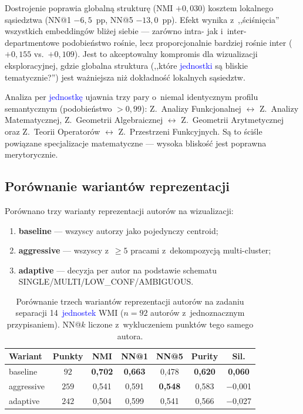 \documentclass[a4paper,11pt,twocolumn]{article}
\newcommand{\hl}[1]{\textcolor{blue}{#1}}
\begin{document}
Dostrojenie poprawia globalną strukturę (NMI $+0{,}030$) kosztem
lokalnego sąsiedztwa (NN@1 $-6{,}5$~pp, NN@5 $-13{,}0$~pp). Efekt
wynika z~,,ściśnięcia'' wszystkich embeddingów bliżej siebie --- zarówno
intra- jak i~inter-departmentowe podobieństwo rośnie, lecz
proporcjonalnie bardziej rośnie inter ($+0{,}155$ vs.\ $+0{,}109$).
Jest to akceptowalny kompromis dla wizualizacji eksploracyjnej,
gdzie globalna struktura (,,które \hl{jednostki} są bliskie
tematycznie?'') jest ważniejsza niż dokładność lokalnych sąsiedztw.

Analiza per \hl{jednostkę} ujawnia trzy pary o~niemal identycznym
profilu semantycznym (podobieństwo $> 0{,}99$): Z.~Analizy Funkcjonalnej
$\leftrightarrow$ Z.~Analizy Matematycznej, Z.~Geometrii Algebraicznej
$\leftrightarrow$ Z.~Geometrii Arytmetycznej oraz Z.~Teorii Operatorów
$\leftrightarrow$ Z.~Przestrzeni Funkcyjnych. Są to ściśle powiązane
specjalizacje matematyczne --- wysoka bliskość jest poprawna merytorycznie.


\subsection{Porównanie wariantów reprezentacji}

Porównano trzy warianty reprezentacji autorów na wizualizacji:
\begin{enumerate}
  \item \textbf{baseline} --- wszyscy autorzy jako pojedynczy centroid;
  \item \textbf{aggressive} --- wszyscy z~$\geq 5$ pracami z~dekompozycją
        multi-cluster;
  \item \textbf{adaptive} --- decyzja per autor na podstawie schematu
        SINGLE/MULTI/LOW\_CONF/AMBIGUOUS.
\end{enumerate}

\begin{table}[t]
\centering
\caption{Porównanie trzech wariantów reprezentacji autorów
na zadaniu separacji 14~\hl{jednostek} WMI ($n=92$ autorów
z~jednoznacznym przypisaniem). NN@$k$ liczone z~wykluczeniem punktów
tego samego autora.}
\label{tab:variants}
\small
\setlength{\tabcolsep}{8pt}
\begin{tabular}{@{}lcccccc@{}}
\toprule
Wariant & Punkty & NMI & NN@1 & NN@5 & Purity & Sil. \\
\midrule
baseline   &  $92$ & \textbf{0{,}702} & \textbf{0{,}663} & 0{,}478 & \textbf{0{,}620} & \phantom{$-$}\textbf{0{,}060} \\
aggressive & $259$ & 0{,}541          & 0{,}591          & \textbf{0{,}548} & 0{,}583 & $-$0{,}001 \\
adaptive   & $242$ & 0{,}504          & 0{,}599          & 0{,}541 & 0{,}566 & $-$0{,}027 \\
\bottomrule
\end{tabular}
\end{table}
\end{document}
